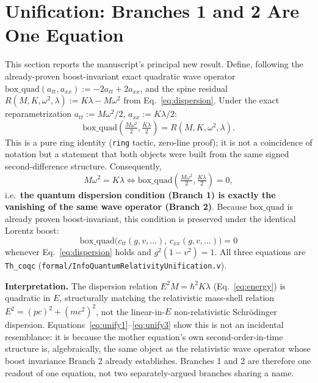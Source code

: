 \documentclass[10pt,twocolumn]{article}
\begin{document}
\section{Unification: Branches 1 and 2 Are One Equation}
\label{sec:unification}
This section reports the manuscript's principal new result. Define, following the
already-proven boost-invariant exact quadratic wave operator
$\mathrm{box\_quad}(a_{tt},a_{xx}) := -2a_{tt}+2a_{xx}$, and the spine residual
$R(M,K,\omega^2,\lambda) := K\lambda-M\omega^2$ from Eq.~\ref{eq:dispersion}. Under
the exact reparametrization $a_{tt}:=M\omega^2/2$, $a_{xx}:=K\lambda/2$:
\begin{equation}
\mathrm{box\_quad}\!\left(\tfrac{M\omega^2}{2},\tfrac{K\lambda}{2}\right) = R(M,K,\omega^2,\lambda).
\label{eq:unify1}
\end{equation}
This is a pure ring identity (\texttt{ring} tactic, zero-line proof); it is not a
coincidence of notation but a statement that both objects were built from the same
signed second-difference structure. Consequently,
\begin{equation}
M\omega^2 = K\lambda \iff \mathrm{box\_quad}\!\left(\tfrac{M\omega^2}{2},\tfrac{K\lambda}{2}\right) = 0,
\label{eq:unify2}
\end{equation}
i.e.\ \textbf{the quantum dispersion condition (Branch 1) is exactly the vanishing of
the same wave operator (Branch 2)}. Because $\mathrm{box\_quad}$ is already proven
boost-invariant, this condition is preserved under the identical Lorentz boost:
\begin{equation}
\mathrm{box\_quad}\big(c_{tt}(g,v,\ldots),\,c_{xx}(g,v,\ldots)\big) = 0
\label{eq:unify3}
\end{equation}
whenever Eq.~\ref{eq:dispersion} holds and $g^2(1-v^2)=1$. All three equations are
\texttt{Th\_coqc} (\texttt{formal/InfoQuantumRelativityUnification.v}).

\textbf{Interpretation.} The dispersion relation $E^2M=\hbar^2K\lambda$
(Eq.~\ref{eq:energy}) is quadratic in $E$, structurally matching the relativistic
mass-shell relation $E^2=(pc)^2+(mc^2)^2$, not the linear-in-$E$ non-relativistic
Schr\"odinger dispersion. Equations~\ref{eq:unify1}--\ref{eq:unify3} show this is not
an incidental resemblance: it is because the mother equation's own second-order-in-time
structure is, algebraically, the same object as the relativistic wave operator whose
boost invariance Branch 2 already establishes. Branches 1 and 2 are therefore one
readout of one equation, not two separately-argued branches sharing a name.
\end{document}
